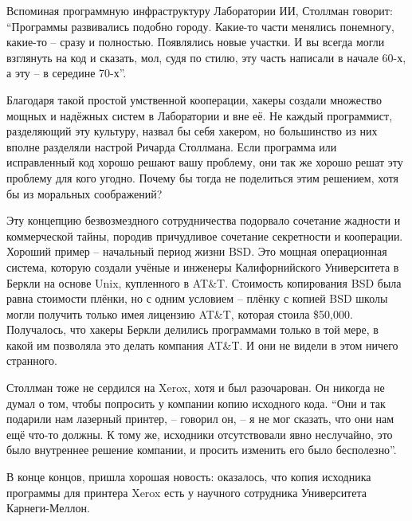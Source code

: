 Вспоминая программную инфраструктуру Лаборатории ИИ, Столлман говорит: \enquote{Программы развивались подобно городу. Какие-то части менялись понемногу, какие-то -- сразу и полностью. Появлялись новые участки. И вы всегда могли взглянуть на код и сказать, мол, судя по стилю, эту часть написали в начале 60-х, а эту -- в середине 70-х\hspace{0.01in}}.

Благодаря такой простой умственной кооперации, хакеры создали множество мощных и надёжных систем в Лаборатории и вне её. Не каждый программист, разделяющий эту культуру, назвал бы себя хакером, но большинство из них вполне разделяли настрой Ричарда Столлмана. Если программа или исправленный код хорошо решают вашу проблему, они так же хорошо решат эту проблему для кого угодно. Почему бы тогда не поделиться этим решением, хотя бы из моральных соображений?

Эту концепцию безвозмездного сотрудничества подорвало сочетание жадности и коммерческой тайны, породив причудливое сочетание секретности и кооперации. Хороший пример -- начальный период жизни BSD. Это мощная операционная система, которую создали учёные и инженеры Калифорнийского Университета в Беркли на основе Unix, купленного в AT\&T. Стоимость копирования BSD была равна стоимости плёнки, но с одним условием -- плёнку с копией BSD школы могли получить только имея лицензию AT\&T, которая стоила \$50,000. Получалось, что хакеры Беркли делились программами только в той мере, в какой им позволяла это делать компания AT\&T. И они не видели в этом ничего странного.

Столлман тоже не сердился на Xerox, хотя и был разочарован. Он никогда не думал о том, чтобы попросить у компании копию исходного кода. \enquote{Они и так подарили нам лазерный принтер, -- говорил он, -- я не мог сказать, что они нам ещё что-то должны. К тому же, исходники отсутствовали явно неслучайно, это было внутреннее решение компании, и просить изменить его было бесполезно}.

В конце концов, пришла хорошая новость: оказалось, что копия исходника программы для принтера Xerox есть у научного сотрудника Университета Карнеги-Меллон.

